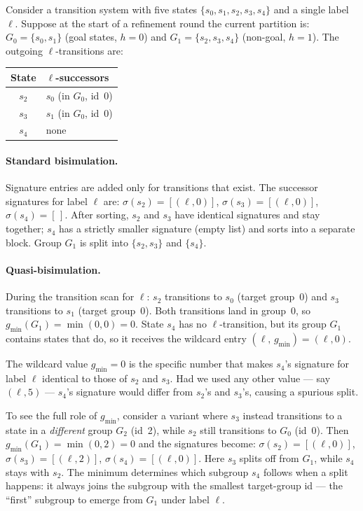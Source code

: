\documentclass[11pt,a4paper]{article}
\begin{document}
Consider a transition system with five states $\{s_0, s_1, s_2, s_3, s_4\}$
and a single label $\ell$.  Suppose at the start of a refinement round the
current partition is:
$G_0 = \{s_0, s_1\}$ (goal states, $h = 0$) and
$G_1 = \{s_2, s_3, s_4\}$ (non-goal, $h = 1$).
The outgoing $\ell$-transitions are:

\begin{center}
\begin{tabular}{cl}
\toprule
\textbf{State} & \textbf{$\ell$-successors} \\
\midrule
$s_2$ & $s_0$ (in $G_0$, id~0) \\
$s_3$ & $s_1$ (in $G_0$, id~0) \\
$s_4$ & none \\
\bottomrule
\end{tabular}
\end{center}

\paragraph{Standard bisimulation.}
Signature entries are added only for transitions that exist.  The successor
signatures for label $\ell$ are:
$\sigma(s_2) = [(\ell, 0)]$,
$\sigma(s_3) = [(\ell, 0)]$,
$\sigma(s_4) = [\,]$.
After sorting, $s_2$ and $s_3$ have identical signatures and stay together;
$s_4$ has a strictly smaller signature (empty list) and sorts into a separate
block.  Group $G_1$ is split into $\{s_2, s_3\}$ and $\{s_4\}$.

\paragraph{Quasi-bisimulation.}
During the transition scan for $\ell$: $s_2$ transitions to $s_0$ (target
group~0) and $s_3$ transitions to $s_1$ (target group~0).  Both transitions
land in group~0, so $g_{\min}(G_1) = \min(0, 0) = 0$.  State $s_4$ has no
$\ell$-transition, but its group $G_1$ contains states that do, so it receives
the wildcard entry $(\ell,\, g_{\min}) = (\ell, 0)$.

The wildcard value $g_{\min} = 0$ is the specific number that makes
$s_4$'s signature for label $\ell$ identical to those of $s_2$ and $s_3$.
Had we used any other value --- say $(\ell, 5)$ --- $s_4$'s signature would
differ from $s_2$'s and $s_3$'s, causing a spurious split.

To see the full role of $g_{\min}$, consider a variant where $s_3$ instead
transitions to a state in a \emph{different} group $G_2$ (id~2), while $s_2$
still transitions to $G_0$ (id~0).  Then $g_{\min}(G_1) = \min(0, 2) = 0$
and the signatures become:
$\sigma(s_2) = [(\ell, 0)]$,
$\sigma(s_3) = [(\ell, 2)]$,
$\sigma(s_4) = [(\ell, 0)]$.
Here $s_3$ splits off from $G_1$, while $s_4$ stays with $s_2$.  The minimum
determines which subgroup $s_4$ follows when a split happens: it always joins
the subgroup with the smallest target-group id --- the ``first'' subgroup to
emerge from $G_1$ under label $\ell$.
\end{document}
